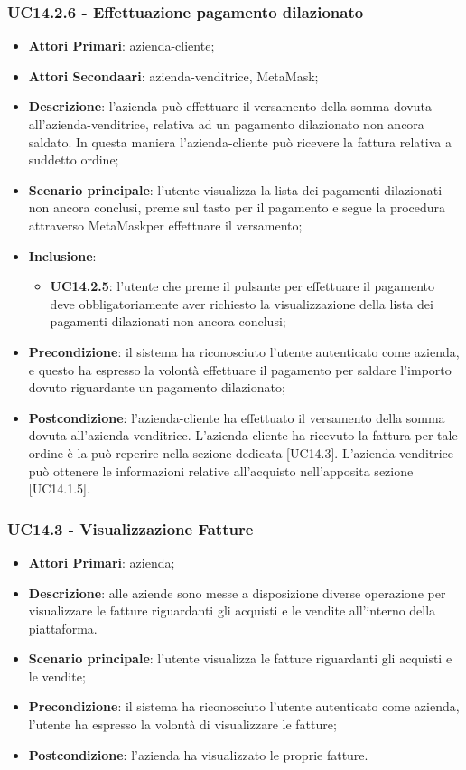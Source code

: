 \subsubsection{UC14.2.6 - Effettuazione pagamento dilazionato}
\begin{itemize}
	\item \textbf{Attori Primari}: azienda-cliente;
	\item \textbf{Attori Secondaari}: azienda-venditrice, MetaMask\glo;
	\item \textbf{Descrizione}: l'azienda può effettuare il versamento della somma dovuta all'azienda-venditrice, relativa ad un pagamento dilazionato non ancora saldato. In questa maniera l'azienda-cliente può ricevere la fattura relativa a suddetto ordine;
	\item \textbf{Scenario principale}: l'utente visualizza la lista dei pagamenti dilazionati non ancora conclusi, preme sul tasto per il pagamento e segue la procedura attraverso MetaMask\glosp per effettuare il versamento;
	\item \textbf{Inclusione}: 
	\begin{itemize}
		\item \textbf{UC14.2.5}: l'utente che preme il pulsante per effettuare il pagamento deve obbligatoriamente aver richiesto la visualizzazione della lista dei pagamenti dilazionati non ancora conclusi;
	\end{itemize}
	\item \textbf{Precondizione}: il sistema ha riconosciuto l'utente autenticato come azienda, e questo ha espresso la volontà effettuare il pagamento per saldare l'importo dovuto riguardante un pagamento dilazionato;
	\item \textbf{Postcondizione}: l'azienda-cliente ha effettuato il versamento della somma dovuta all'azienda-venditrice. L'azienda-cliente ha ricevuto la fattura per tale ordine è la può reperire nella sezione dedicata [UC14.3]. L'azienda-venditrice può ottenere le informazioni relative all'acquisto nell'apposita sezione [UC14.1.5].
\end{itemize}


\subsubsection{UC14.3 - Visualizzazione Fatture}
\begin{itemize}
	\item \textbf{Attori Primari}: azienda;
	\item \textbf{Descrizione}: alle aziende sono messe a disposizione diverse operazione per visualizzare le fatture riguardanti gli acquisti e le vendite all'interno della piattaforma.
	\item \textbf{Scenario principale}: l'utente visualizza le fatture riguardanti gli acquisti e le vendite;
	 
	\item \textbf{Precondizione}: il sistema ha riconosciuto l'utente autenticato come azienda, l'utente ha espresso la volontà di visualizzare le fatture;
	\item \textbf{Postcondizione}: l'azienda ha visualizzato le proprie fatture.
\end{itemize} 

